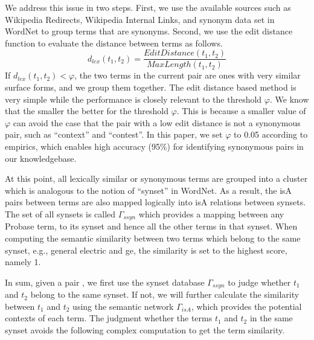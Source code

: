 We address this issue in two steps.  First, we use the available sources such as
Wikipedia Redirects, Wikipedia Internal Links, and synonym data set in
WordNet to group terms that are synonyms.  Second, we use the edit
distance function to evaluate the distance between terms as follows.
\begin{equation*}
d_{lex}(t_{1}, t_{2}) = \frac{EditDistance(t_{1}, t_{2})}{MaxLength(t_{1}, t_{2})}
\label{eq:lexDist*}
\end{equation*}
If $d_{lex}(t_{1}, t_{2}) < \varphi$, the two terms in the current pair are ones with very similar surface forms, and we group them together.
The edit distance based method is very simple while the performance is closely relevant to the threshold $\varphi$. We know that
the smaller the better for the threshold $\varphi$. This is because a smaller value of $\varphi$ can avoid the case that the pair with a low
edit distance is not a synonymous pair, such as ``context'' and ``contest''.
In this paper, we set $\varphi$ to 0.05
according to empirics, which enables high accuracy (95\%)
for identifying synonymous pairs in our knowledgebase.

At this point, all lexically similar or synonymous terms are grouped into a
cluster which is analogous to the notion of ``synset'' in WordNet. As a result,
the isA pairs between terms are also mapped logically into isA relations
between synsets.
The set of all synsets is called $\Gamma_{ssyn}$ which provides a mapping between
any Probase term, to its synset and hence all the other terms in that synset.
When computing the semantic similarity between two terms which belong to
the same synset, e.g., general electric and ge, the similarity is
set to the highest score, namely 1.

{\color{red}In sum, given a pair , we first use the synset database $\Gamma_{ssyn}$ to judge whether $t_1$ and $t_2$ belong to the same synset. If not, we will further calculate the similarity between $t_1$ and $t_2$ using the semantic network $\Gamma_{isA}$, which provides the potential contexts of each term. The judgment whether the terms $t_1$ and $t_2$  in the same synset avoids the following complex computation to get the term similarity.}

%
%

